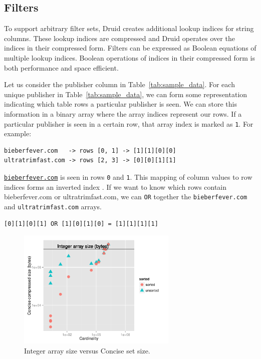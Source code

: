 \documentclass{vldb}
\begin{document}
\subsection{Filters}
To support arbitrary filter sets, Druid creates additional lookup
indices for string columns. These lookup indices are compressed and
Druid operates over the indices in their compressed form. Filters can
be expressed as Boolean equations of multiple lookup indices. Boolean
operations of indices in their compressed form is both performance and
space efficient.

Let us consider the publisher column in
Table~\ref{tab:sample_data}. For each unique publisher in
Table~\ref{tab:sample_data}, we can form some representation
indicating which table rows a particular publisher is seen. We can
store this information in a binary array where the array indices
represent our rows. If a particular publisher is seen in a certain
row, that array index is marked as \texttt{1}. For example:
\begin{verbatim}
bieberfever.com   -> rows [0, 1] -> [1][1][0][0]
ultratrimfast.com -> rows [2, 3] -> [0][0][1][1]
\end{verbatim}

\texttt{\href{http://bieberfever.com}{bieberfever.com}} is seen in rows \texttt{0} and \texttt{1}. This mapping of column values
to row indices forms an inverted index \cite{tomasic1993performance}. If we want to know which
rows contain {\ttfamily bieberfever.com} or {\ttfamily ultratrimfast.com}, we can \texttt{OR} together
the \texttt{bieberfever.com} and \texttt{ultratrimfast.com} arrays.
\begin{verbatim}
[0][1][0][1] OR [1][0][1][0] = [1][1][1][1]
\end{verbatim}

\begin{figure}
\centering
\includegraphics[width = 3in]{concise_plot}
\caption{Integer array size versus Concise set size.}
\label{fig:concise_plot}
\end{figure}
\end{document}
